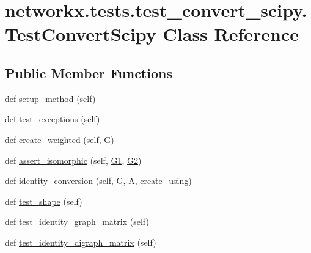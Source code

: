 \hypertarget{classnetworkx_1_1tests_1_1test__convert__scipy_1_1TestConvertScipy}{}\section{networkx.\+tests.\+test\+\_\+convert\+\_\+scipy.\+Test\+Convert\+Scipy Class Reference}
\label{classnetworkx_1_1tests_1_1test__convert__scipy_1_1TestConvertScipy}
\subsection*{Public Member Functions}
\begin{DoxyCompactItemize}
\item 
def \hyperlink{classnetworkx_1_1tests_1_1test__convert__scipy_1_1TestConvertScipy_af5757b59f9e78d757de057fb97911bdf}{setup\+\_\+method} (self)
\item 
def \hyperlink{classnetworkx_1_1tests_1_1test__convert__scipy_1_1TestConvertScipy_a6f9aa92b25b7a22e74998ecd71708d28}{test\+\_\+exceptions} (self)
\item 
def \hyperlink{classnetworkx_1_1tests_1_1test__convert__scipy_1_1TestConvertScipy_adec000bfaddda16ba1591856b30eaa67}{create\+\_\+weighted} (self, G)
\item 
def \hyperlink{classnetworkx_1_1tests_1_1test__convert__scipy_1_1TestConvertScipy_ae23228c611ee6bf228f8edc496d939e7}{assert\+\_\+isomorphic} (self, \hyperlink{classnetworkx_1_1tests_1_1test__convert__scipy_1_1TestConvertScipy_a75660b1e142e2a8c96aa3c55cf1fc44e}{G1}, \hyperlink{classnetworkx_1_1tests_1_1test__convert__scipy_1_1TestConvertScipy_a230be06e36dfa04f1053b8d57e60af57}{G2})
\item 
def \hyperlink{classnetworkx_1_1tests_1_1test__convert__scipy_1_1TestConvertScipy_a0c6047a3c7e2e71d18d1536b4ddfd2c0}{identity\+\_\+conversion} (self, G, A, create\+\_\+using)
\item 
def \hyperlink{classnetworkx_1_1tests_1_1test__convert__scipy_1_1TestConvertScipy_a6ef5374f691915f01f350310aaf351ff}{test\+\_\+shape} (self)
\item 
def \hyperlink{classnetworkx_1_1tests_1_1test__convert__scipy_1_1TestConvertScipy_af674472be29a092ac985dee249e57115}{test\+\_\+identity\+\_\+graph\+\_\+matrix} (self)
\item 
def \hyperlink{classnetworkx_1_1tests_1_1test__convert__scipy_1_1TestConvertScipy_a071949efa285ee311e73137f28ca5cc5}{test\+\_\+identity\+\_\+digraph\+\_\+matrix} (self)

\end{DoxyCompactItemize}
